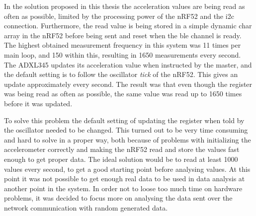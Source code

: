 \noindent In the solution proposed in this thesis the acceleration values are being read as often as possible, limited by the processing power of the \gls{nRF52} and the \gls{i2c} connection. Furthermore, the read value is being stored in a simple dynamic char array in the \gls{nRF52} before being sent and reset when the \gls{ble} channel is ready. The highest obtained measurement frequency in this system was 11 times per main loop, and 150 within this, resulting in 1650 measurements every second. The \gls{ADXL345} updates its acceleration value when instructed by the master, and the default setting is to follow the oscillator \textit{tick} of the \gls{nRF52}. This gives an update approximately every second. The result was that even though the register was being read as often as possible, the same value was read up to 1650 times before it was updated. 



\noindent To solve this problem the default setting of updating the register when told by the oscillator needed to be changed. This turned out to be very time consuming and hard to solve in a proper way, both because of problems with initializing the accelerometer correctly and making the \gls{nRF52} read and store the values fast enough to get proper data. The ideal solution would be to read at least 1000 values every second, to get a good starting point before analysing values. At this point it was not possible to get enough real data to be used in data analysis at another point in the system. In order not to loose too much time on hardware problems, it was decided to focus more on analysing the data sent over the network communication with random generated data. 


